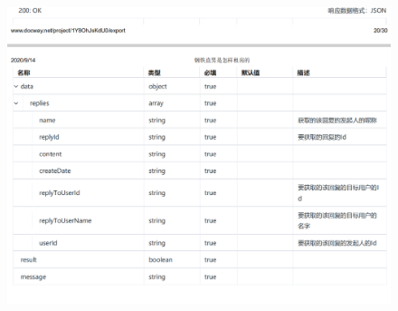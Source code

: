             \begin{figure}[h]
                \centering
                \includegraphics[height=14.0cm,width=14.0cm]{design/image/api22.png} 
                \end{figure}  
                \newpage    
